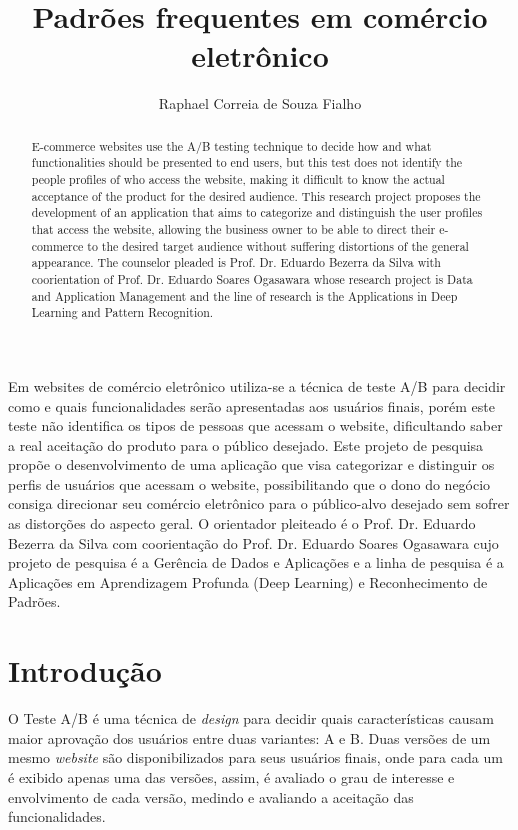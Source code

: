 \documentclass[12pt]{article}
\title{Padrões frequentes em comércio eletrônico}
\author{Raphael Correia de Souza Fialho\inst{1}}
\begin{document}
 

\maketitle

\begin{abstract}
   E-commerce websites use the A/B testing technique to decide how and what functionalities should be presented to end users, but this test does not identify the people profiles of who access the website, making it difficult to know the actual acceptance of the product for the desired audience.
   This research project proposes the development of an application that aims to categorize and distinguish the user profiles that access the website, allowing the business owner to be able to direct their e-commerce to the desired target audience without suffering distortions of the general appearance. The counselor pleaded is Prof. Dr. Eduardo Bezerra da Silva with coorientation of Prof. Dr. Eduardo Soares Ogasawara whose research project is Data and Application Management and the line of research is the Applications in Deep Learning and Pattern Recognition.
\end{abstract}
     
\begin{resumo} 
  Em websites de comércio eletrônico utiliza-se a técnica de teste A/B para decidir como e quais funcionalidades serão apresentadas aos usuários finais, porém este teste não identifica os tipos de pessoas que acessam o website, dificultando saber a real aceitação do produto para o público desejado.
  Este projeto de pesquisa propõe o desenvolvimento de uma aplicação que visa categorizar e distinguir os perfis de usuários que acessam o website, possibilitando que o dono do negócio consiga direcionar seu comércio eletrônico para o público-alvo desejado sem sofrer as distorções do aspecto geral. O orientador pleiteado é o Prof. Dr. Eduardo Bezerra da Silva com coorientação do Prof. Dr. Eduardo Soares Ogasawara cujo projeto de pesquisa é a Gerência de Dados e Aplicações e a linha de pesquisa é a Aplicações em Aprendizagem Profunda (Deep Learning) e Reconhecimento de Padrões.
\end{resumo}


\section{Introdução}

O Teste A/B é uma técnica de \textit{design} para decidir quais características causam maior aprovação dos usuários entre duas variantes: A e B. Duas versões de um mesmo \textit{website} são disponibilizados para seus usuários finais, onde para cada um é exibido apenas uma das versões, assim, é avaliado o grau de interesse e envolvimento de cada versão, medindo e avaliando a aceitação das funcionalidades.
\end{document}
